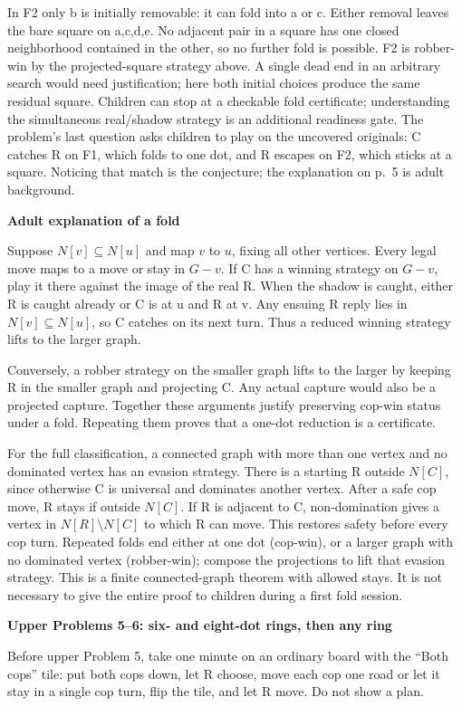 \documentclass[11pt,letterpaper]{article}
\newcommand{\heading}[1]{\par\vspace{4pt}{\large\bfseries #1}\par}
\newcommand{\sub}[1]{\par\textbf{#1}\par}
\begin{document}
In F2 only b is initially removable: it can fold into a or c. Either removal leaves the bare square on a,c,d,e. No adjacent pair in a square has one closed neighborhood contained in the other, so no further fold is possible. F2 is robber-win by the projected-square strategy above. A single dead end in an arbitrary search would need justification; here both initial choices produce the same residual square. Children can stop at a checkable fold certificate; understanding the simultaneous real/shadow strategy is an additional readiness gate. The problem's last question asks children to play on the uncovered originals: C catches R on F1, which folds to one dot, and R escapes on F2, which sticks at a square. Noticing that match is the conjecture; the explanation on p.~5 is adult background.
\newpage
\heading{Why folds work; two-cop return visit}
\sub{Adult explanation of a fold}
Suppose $N[v]\subseteq N[u]$ and map $v$ to $u$, fixing all other vertices. Every legal move maps to a move or stay in $G-v$. If C has a winning strategy on $G-v$, play it there against the image of the real R. When the shadow is caught, either R is caught already or C is at u and R at v. Any ensuing R reply lies in $N[v]\subseteq N[u]$, so C catches on its next turn. Thus a reduced winning strategy lifts to the larger graph.

Conversely, a robber strategy on the smaller graph lifts to the larger by keeping R in the smaller graph and projecting C. Any actual capture would also be a projected capture. Together these arguments justify preserving cop-win status under a fold. Repeating them proves that a one-dot reduction is a certificate.

For the full classification, a connected graph with more than one vertex and no dominated vertex has an evasion strategy. There is a starting R outside $N[C]$, since otherwise C is universal and dominates another vertex. After a safe cop move, R stays if outside $N[C]$. If R is adjacent to C, non-domination gives a vertex in $N[R]\setminus N[C]$ to which R can move. This restores safety before every cop turn. Repeated folds end either at one dot (cop-win), or a larger graph with no dominated vertex (robber-win); compose the projections to lift that evasion strategy. This is a finite connected-graph theorem with allowed stays. It is not necessary to give the entire proof to children during a first fold session.

\sub{Upper Problems 5--6: six- and eight-dot rings, then any ring}
Before upper Problem 5, take one minute on an ordinary board with the ``Both cops'' tile: put both cops down, let R choose, move each cop one road or let it stay in a single cop turn, flip the tile, and let R move. Do not show a plan.
\end{document}
